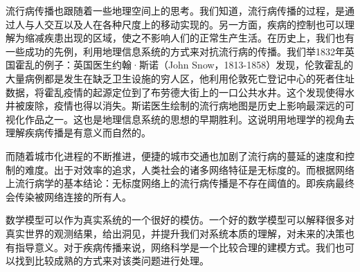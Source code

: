 流行病传播也跟随着一些地理空间上的思考。我们知道，流行病传播的过程，是通过人与人交互以及人在各种尺度上的移动实现的\cite{belik2011natural}。另一方面，疾病的控制也可以理解为缩减疾患出现的区域，使之不影响人们的正常生产生活。在历史上，我们也有一些成功的先例，利用地理信息系统的方式来对抗流行病的传播。我们举1832年英国霍乱的例子：英国医生约翰·斯诺（John Snow，1813-1858）发现，伦敦霍乱的大量病例都是发生在缺乏卫生设施的穷人区，他利用伦敦死亡登记中心的死者住址数据，将霍乱疫情的起源定位到了布劳德大街上的一口公共水井。这个发现使得水井被废除，疫情也得以消失。斯诺医生绘制的流行病地图是历史上影响最深远的可视化作品之一。这也是地理信息系统的思想的早期胜利。这说明用地理学的视角去理解疾病传播是有意义而自然的。

而随着城市化进程的不断推进，便捷的城市交通也加剧了流行病的蔓延的速度和控制的难度。出于对效率的追求，人类社会的诸多网络特征是无标度的。而根据网络上流行病学的基本结论：无标度网络上的流行病传播是不存在阈值的。即疾病最终会传染被网络连接的所有人。

数学模型可以作为真实系统的一个很好的模仿。一个好的数学模型可以解释很多对真实世界的观测结果，给出洞见，并提升我们对系统本质的理解，对未来的决策也有指导意义。对于疾病传播来说，网络科学是一个比较合理的建模方式。我们也可以找到比较成熟的方式来对该类问题进行处理\cite{kiss2017mathematics}。